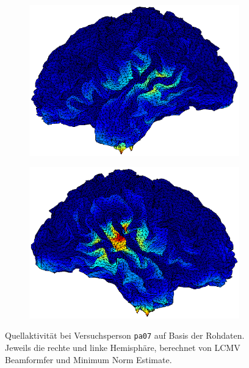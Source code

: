 \documentclass[doc,a4paper,12pt]{apa6}
\begin{document}
\begin{figure}
  \vspace*{0.04\textwidth}
  \begin{subfigure}[c]{0.47\textwidth}
    \includegraphics[width=\textwidth]{ergebnisse/activity/pa07_eve2_raw_mne_activity_left.eps}
    \label{img:activity-latera:mne:left}
  \end{subfigure}\hspace*{0.04\textwidth}
  \begin{subfigure}[c]{0.47\textwidth}
    \includegraphics[width=\textwidth]{ergebnisse/activity/pa07_eve2_raw_mne_activity_right.eps}
    \label{img:activity-latera:mne:right}
  \end{subfigure}
  \captionsetup{justification=justified}
  \caption[Quellaktivität bei Versuchsperson \texttt{pa07} auf Basis der Rohdaten.]{Quellaktivität bei Versuchsperson \texttt{pa07} auf Basis der Rohdaten. Jeweils die rechte und linke Hemisphäre, berechnet von LCMV Beamformfer und Minimum Norm Estimate.}
  \label{img:activity-lateral}
\end{figure}
\end{document}
